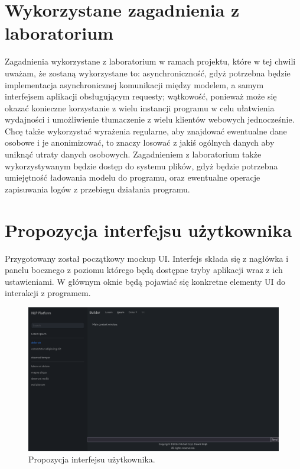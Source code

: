 \documentclass{article}
\begin{document}
\section{Wykorzystane zagadnienia z laboratorium}

Zagadnienia wykorzystane z laboratorium w ramach projektu, które w tej chwili uważam, że zostaną wykorzystane to: asynchroniczność, gdyż potrzebna będzie implementacja asynchronicznej komunikacji między modelem, a samym interfejsem aplikacji obsługującym requesty; wątkowość, ponieważ może się okazać konieczne korzystanie z wielu instancji programu w celu ułatwienia wydajności i umożliwienie tłumaczenie z wielu klientów webowych jednocześnie. Chcę także wykorzystać wyrażenia regularne, aby znajdować ewentualne dane osobowe i je anonimizować, to znaczy losować z jakiś ogólnych danych aby uniknąć utraty danych osobowych. Zagadnieniem z laboratorium także wykorzystywanym będzie dostęp do systemu plików, gdyż będzie potrzebna umiejętność ładowania modelu do programu, oraz ewentualne operacje zapisuwania logów z przebiegu działania programu.

\section{Propozycja interfejsu użytkownika}

Przygotowany został początkowy mockup UI. 
Interfejs składa się z nagłówka i panelu bocznego z poziomu którego będą dostępne tryby aplikacji wraz z ich ustawieniami. W głównym oknie będą pojawiać się konkretne elementy UI do interakcji z programem.

\begin{figure}
\centering
  \includegraphics[width=1\linewidth]{ui_mockup.png}
  \caption{\label{fig:ui mockup}Propozycja interfejsu użytkownika.}
\end{figure}
\end{document}
